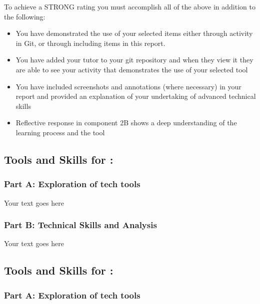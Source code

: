 \documentclass[a4paper, 11pt]{report}
\begin{document}
To achieve a STRONG rating you must accomplish all of the above in addition to the following:
\begin{itemize}
    \item You have demonstrated the use of your selected items either through activity in Git, or through including items in this report.
    \item You have added your tutor to your git repository and when they view it they are able to see your activity that demonstrates the use of your selected tool
    \item You have included screenshots and annotations (where necessary) in your report and provided an explanation of your undertaking of advanced technical skills
    \item Reflective response in component 2B shows a deep understanding of the learning process and the tool
\end{itemize}

\vspace{4ex}


\subsection{Tools and Skills for \majA: \studA}

\subsubsection{Part A: Exploration of tech tools}

Your text goes here

\subsubsection{Part B: Technical Skills and Analysis}

Your text goes here




\subsection{Tools and Skills for \majB: \studB}

\subsubsection{Part A: Exploration of tech tools}
\end{document}
